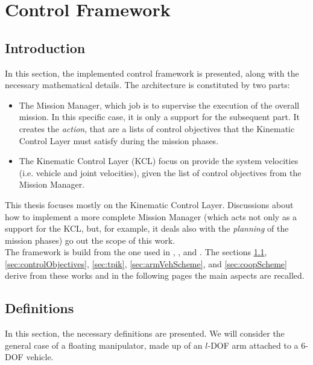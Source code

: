 

\chapter{Control Framework}
\label{chap:control}
\ifpdf
    \graphicspath{{ControlFramework/Figures/PNG/}{ControlFramework/Figures/PDF/}{ControlFramework/Figures/}}
\else
    \graphicspath{{ControlFramework/Figures/EPS/}{ControlFramework/Figures/}}
\fi

\section*{Introduction}
In this section, the implemented control framework is presented, along with the necessary mathematical details. The architecture is constituted by two parts:
\begin{itemize}
	\item The Mission Manager, which job is to supervise the execution of the overall mission. In this specific case, it is only a support for the subsequent part. It creates the \textit{action}, that are a lists of control objectives that the Kinematic Control Layer must satisfy during the mission phases. 
	\item The Kinematic Control Layer (KCL) focus on provide the system velocities (i.e. vehicle and joint velocities), given the list of control objectives from the Mission Manager.
\end{itemize}
This thesis focuses mostly on the Kinematic Control Layer. Discussions about how to implement a more complete Mission Manager (which acts not only as a support for the KCL, but, for example, it deals also with the \textit{planning} of the mission phases) go out the scope of this work.\\

The framework is build from the one used in \cite{IntroMaris2}, \cite{tesiWander}, and \cite{IntroRecent}. The sections \ref{sec:definitions}, \ref{sec:controlObjectives}, \ref{sec:tpik}, \ref{sec:armVehScheme}, and \ref{sec:coopScheme} derive from these works and in the following pages the main aspects are recalled.

\section{Definitions}
\label{sec:definitions}
In this section, the necessary definitions are presented. We will consider the general case of a floating manipulator, made up of an $l$-DOF arm attached to a 6-DOF vehicle.\\

